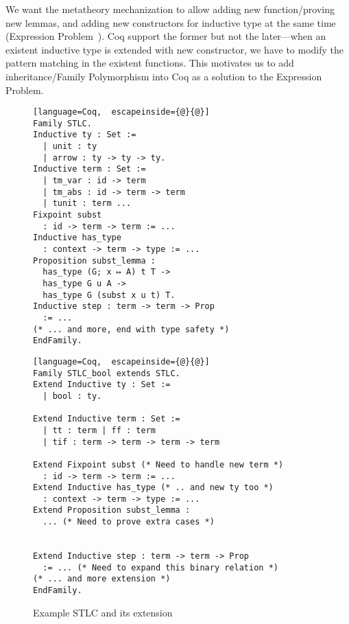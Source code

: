 

\newpage

We want the metatheory mechanization to allow adding new
function/proving new lemmas, and adding new constructors for inductive
type at the same time  (Expression Problem~\cite{wadler-ep}). Coq
support the former but not the later---when an existent inductive type
is extended with new constructor, we have to modify the pattern matching
in the existent functions. This motivates us to add inheritance/Family
Polymorphism into Coq as a solution to the Expression Problem. 

\begin{figure}[!htb]
  \begin{minipage}[t]{0.47\linewidth}
\begin{lstlisting}[language=Coq,  escapeinside={@}{@}]
Family STLC.
Inductive ty : Set :=
  | unit : ty
  | arrow : ty -> ty -> ty.
Inductive term : Set := 
  | tm_var : id -> term 
  | tm_abs : id -> term -> term 
  | tunit : term ...
Fixpoint subst 
  : id -> term -> term := ...
Inductive has_type 
  : context -> term -> type := ...
Proposition subst_lemma :
  has_type (G; x ↦ A) t T ->
  has_type G u A ->
  has_type G (subst x u t) T.
Inductive step : term -> term -> Prop 
  := ...
(* ... and more, end with type safety *)
EndFamily.
\end{lstlisting}
  \end{minipage}
  \begin{minipage}[t]{0.47\linewidth}
\begin{lstlisting}[language=Coq,  escapeinside={@}{@}]
Family STLC_bool extends STLC.
Extend Inductive ty : Set :=
  | bool : ty.

Extend Inductive term : Set := 
  | tt : term | ff : term 
  | tif : term -> term -> term -> term

Extend Fixpoint subst (* Need to handle new term *)
  : id -> term -> term := ...
Extend Inductive has_type (* .. and new ty too *)
  : context -> term -> type := ...
Extend Proposition subst_lemma :
  ... (* Need to prove extra cases *)


Extend Inductive step : term -> term -> Prop 
  := ... (* Need to expand this binary relation *)
(* ... and more extension *)
EndFamily.
\end{lstlisting}
  \end{minipage}
  \caption{Example STLC and its extension}\label{fig:STLC-example}
\end{figure}

